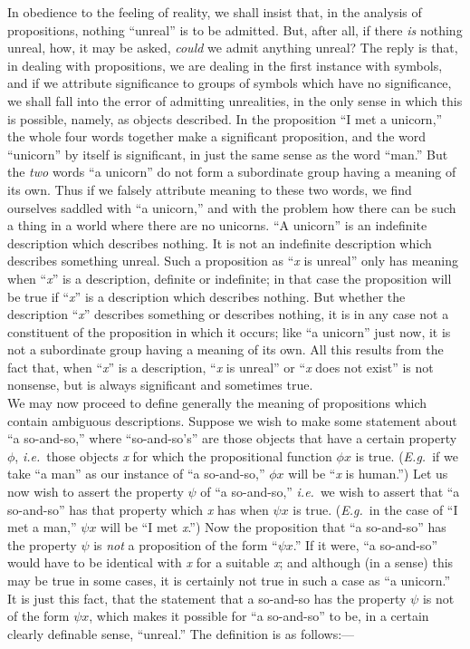 {In obedience to the feeling of reality,
we shall insist
that,
in the
analysis of propositions, nothing ``unreal'' is to be admitted. But,
after all, if there \textit{is}
nothing unreal, how, it may be asked, \textit{could} we
admit anything unreal? The reply is that, in dealing with propositions,
we are dealing in the first instance with symbols, and if we attribute
significance to groups of symbols which have no significance, we shall
fall into the error of admitting unrealities, in the only sense in
which this is possible, namely, as objects described. In the
proposition ``I met a unicorn,'' the whole four words together make a
significant proposition, and the word ``unicorn'' by itself is
significant, in just the same sense as the word ``man.'' But the \textit{two} words ``a
unicorn'' do not form a subordinate
group having a meaning
of its
own. Thus if we falsely attribute meaning to these two words, we find
ourselves saddled with ``a unicorn,'' and with the problem how there can
be such a thing in a world where there are no unicorns. ``A unicorn'' is
an indefinite description which describes nothing. It is not an
indefinite description which describes something unreal. Such a
proposition as ``\textit{x}
is unreal'' only has meaning when ``\textit{x}''
is a
description, definite or indefinite; in that case the proposition will
be true if ``\textit{x}''
is a description which describes nothing. But whether
the description ``\textit{x}''
describes something or describes nothing, it is in
any case not a constituent of the proposition in which it occurs; like
``a unicorn'' just
now, it is not a subordinate group having a meaning of
its own. All this results from the fact that, when ``\textit{x}'' is a
description, ``\textit{x}
is unreal'' or ``\textit{x}
does not exist'' is not nonsense, but
is always significant and sometimes true.~\kkpmarkonly\\
\indent {}We may now proceed to define generally
the meaning of
propositions
which contain ambiguous descriptions. Suppose we wish to make some
statement about ``a so-and-so,'' where ``so-and-so's'' are those objects
that have a certain property \ensuremath{\phi}, \textit{i.e.}\ those objects
\textit{x} for
which
the propositional function $\phi x$
is true. (\textit{E.g.}\ if we take ``a
man'' as
our instance of ``a so-and-so,'' $\phi x$ will be ``\textit{x} is human.'') Let
us now
wish to assert the property \ensuremath{\psi} of ``a so-and-so,'' \textit{i.e.}\ we wish to
assert that ``a so-and-so'' has that property which \textit{x} has
when $\psi x$
is
true. (\textit{E.g.}\ in the case of ``I met a man,'' $\psi x$ will be ``I met \textit{x}.'') Now
the proposition that ``a so-and-so'' has the property \ensuremath{\psi} is \textit{not} a
proposition of the form ``$\psi x$.''
If it were, ``a so-and-so'' would have to
be identical with \textit{x}
for a suitable \textit{x};
and although (in a sense) this
may be true in some cases, it is certainly not true in such a case as
``a unicorn.'' It is just this fact, that the statement that a so-and-so
has the property \ensuremath{\psi}
is not of the form $\psi x$,
which makes it possible
for ``a so-and-so'' to be, in a certain clearly definable sense,
``unreal.'' The definition is as follows:---}
